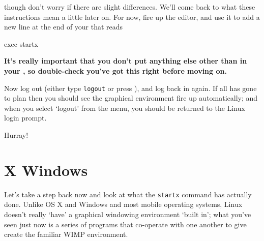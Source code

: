 though don't worry if there are slight differences. We'll come back to what these instructions mean a little later on. For now, fire up the  editor, and use it to add a new line at the end of your  that reads 

\begin{ttoutenv}
exec startx
\end{ttoutenv}

\textbf{It's really important that you don't put anything else other than  in your , so double-check you've got this right before moving on.}

Now log out (either type \texttt{logout} or press ), and log back in again. If all has gone to plan then you should see the graphical environment fire up automatically; and when you select `logout' from the menu, you should be returned to the Linux login prompt. 

Hurray!

\section{X Windows}

Let's take a step back now and look at what the \texttt{startx} command has actually done. Unlike OS X and Windows and most mobile operating systems, Linux doesn't really `have' a graphical windowing environment `built in'; what you've seen just now is a series of programs that co-operate with one another to give create the familiar WIMP environment. 

